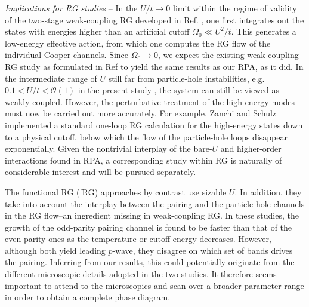 \documentclass[aps,prl,twocolumn,superscriptaddress,showpacs]{revtex4-1}
\newcommand{\ra}{\rightarrow}
\begin{document}


{\it Implications for RG studies} -- In the $U/t \ra 0$ limit within the regime of validity of the two-stage weak-coupling RG developed in Ref. , one first integrates out the states with energies higher than an artificial cutoff $\Omega_0 \ll U^2/t$. This generates a low-energy effective action, from which one computes the RG flow of the individual Cooper channels. Since $\Omega_0 \ra 0$, we expect the existing weak-coupling RG study as formulated in Ref  to yield the same results as our RPA, as it did. In the intermediate range of $U$ still far from particle-hole instabilities, e.g. $0.1<U/t < \mathcal{O}(1)$ in the present study \cite{footnote}, the system can still be viewed as weakly coupled. However, the perturbative treatment of the high-energy modes must now be carried out more accurately. For example, Zanchi and Schulz \cite{Zanchi:96} implemented a standard one-loop RG calculation for the high-energy states down to a physical cutoff, below which the flow of the particle-hole loops disappear exponentially. Given the nontrivial interplay of the bare-$U$ and higher-order interactions found in RPA, a corresponding study within RG is naturally of considerable interest and will be pursued separately.

The functional RG (fRG) approaches \cite{Wang:13,Tsuchiizu:15} by contrast use sizable $U$. In addition, they take into account the interplay between the pairing and the particle-hole channels in the RG flow--an ingredient missing in weak-coupling RG. In these studies, the growth of the odd-parity pairing channel is found to be faster than that of the even-parity ones as the temperature or cutoff energy decreases. However, although both yield leading $p$-wave, they disagree on which set of bands drives the pairing. Inferring from our results, this could potentially originate from the different microscopic details adopted in the two studies. It therefore seems important to attend to the microscopics and scan over a broader parameter range in order to obtain a complete phase diagram.
\end{document}
